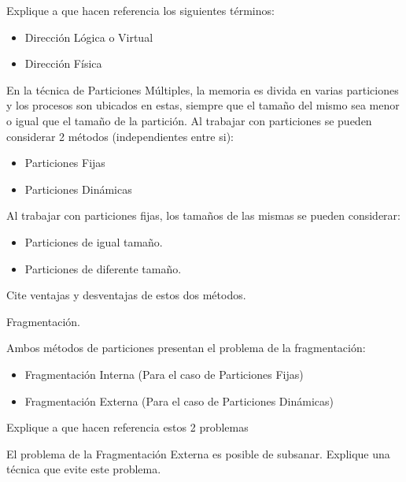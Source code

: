 \begin{questions}
\question Explique a que hacen referencia los siguientes términos:
\begin{itemize}
	\item Dirección Lógica o Virtual
	\item Dirección Física
\end{itemize}

\question En la técnica de Particiones Múltiples, la memoria es divida en varias particiones y los procesos son ubicados en estas, siempre que el tamaño del mismo sea menor o igual que el tamaño de la partición. Al trabajar con particiones se pueden considerar 2 métodos (independientes entre si):
\begin{itemize}
	\item Particiones Fijas
	\item Particiones Dinámicas
\end{itemize}

\question Al trabajar con particiones fijas, los tamaños de las mismas se pueden considerar:
\begin{itemize}
	\item Particiones de igual tamaño.
	\item Particiones de diferente tamaño.
\end{itemize}
Cite ventajas y desventajas de estos dos métodos.

\question Fragmentación.

Ambos métodos de particiones presentan el problema de la fragmentación:
\begin{itemize}
	\item Fragmentación Interna (Para el caso de Particiones Fijas)
	\item Fragmentación Externa (Para el caso de Particiones Dinámicas)
\end{itemize}
\begin{parts}
	\item Explique a que hacen referencia estos 2 problemas
	\item El problema de la Fragmentación Externa es posible de subsanar. Explique una técnica que evite este problema.
\end{parts}


\end{questions}
